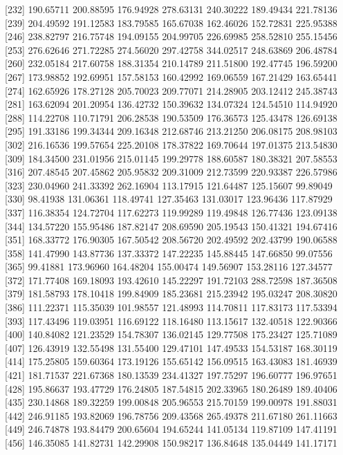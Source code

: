 \documentclass[
  10pt,
  a4paper,oneside]{article}
\begin{document}
{[}232{]} 190.65711 200.88595 176.94928 278.63131 240.30222 189.49434 221.78136
{[}239{]} 204.49592 191.12583 183.79585 165.67038 162.46026 152.72831 225.95388
{[}246{]} 238.82797 216.75748 194.09155 204.99705 226.69985 258.52810 255.15456
{[}253{]} 276.62646 271.72285 274.56020 297.42758 344.02517 248.63869 206.48784
{[}260{]} 232.05184 217.60758 188.31354 210.14789 211.51800 192.47745 196.59200
{[}267{]} 173.98852 192.69951 157.58153 160.42992 169.06559 167.21429 163.65441
{[}274{]} 162.65926 178.27128 205.70023 209.77071 214.28905 203.12412 245.38743
{[}281{]} 163.62094 201.20954 136.42732 150.39632 134.07324 124.54510 114.94920
{[}288{]} 114.22708 110.71791 206.28538 190.53509 176.36573 125.43478 126.69138
{[}295{]} 191.33186 199.34344 209.16348 212.68746 213.21250 206.08175 208.98103
{[}302{]} 216.16536 199.57654 225.20108 178.37822 169.70644 197.01375 213.54830
{[}309{]} 184.34500 231.01956 215.01145 199.29778 188.60587 180.38321 207.58553
{[}316{]} 207.48545 207.45862 205.95832 209.31009 212.73599 220.93387 226.57986
{[}323{]} 230.04960 241.33392 262.16904 113.17915 121.64487 125.15607 99.89049
{[}330{]} 98.41938 131.06361 118.49741 127.35463 131.03017 123.96436 117.87929
{[}337{]} 116.38354 124.72704 117.62273 119.99289 119.49848 126.77436 123.09138
{[}344{]} 134.57220 155.95486 187.82147 208.69590 205.19543 150.41321 194.67416
{[}351{]} 168.33772 176.90305 167.50542 208.56720 202.49592 202.43799 190.06588
{[}358{]} 141.47990 143.87736 137.33372 147.22235 145.88445 147.66850 99.07556
{[}365{]} 99.41881 173.96960 164.48204 155.00474 149.56907 153.28116 127.34577
{[}372{]} 171.77408 169.18093 193.42610 145.22297 191.72103 288.72598 187.36508
{[}379{]} 181.58793 178.10418 199.84909 185.23681 215.23942 195.03247 208.30820
{[}386{]} 111.22371 115.35039 101.98557 121.48993 114.70811 117.83173 117.53394
{[}393{]} 117.43496 119.03951 116.69122 118.16480 113.15617 132.40518 122.90366
{[}400{]} 140.84082 121.23529 154.78307 136.02145 129.77508 175.23427 125.71089
{[}407{]} 126.43919 132.55498 131.55400 129.47101 147.49533 154.53187 168.30119
{[}414{]} 175.25805 159.60364 173.19126 155.65142 156.09515 163.43083 181.46939
{[}421{]} 181.71537 221.67368 180.13539 234.41327 197.75297 196.60777 196.97651
{[}428{]} 195.86637 193.47729 176.24805 187.54815 202.33965 180.26489 189.40406
{[}435{]} 230.14868 189.32259 199.00848 205.96553 215.70159 199.00978 191.88031
{[}442{]} 246.91185 193.82069 196.78756 209.43568 265.49378 211.67180 261.11663
{[}449{]} 246.74878 193.84479 200.65604 194.65244 141.05134 119.87109 147.41191
{[}456{]} 146.35085 141.82731 142.29908 150.98217 136.84648 135.04449 141.17171
\end{document}

